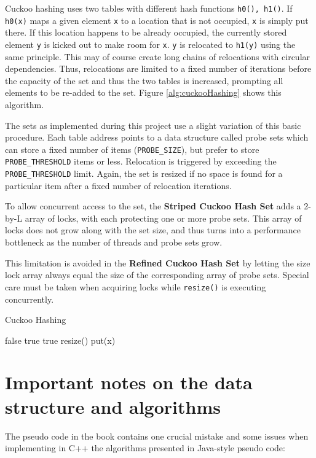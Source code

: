 \documentclass[a4paper,10pt]{article}
\begin{document}
Cuckoo hashing uses two tables with different hash functions
\lstinline|h0(), h1()|. If \lstinline|h0(x)| maps a given element \lstinline|x|
to a location that is not occupied, \lstinline|x| is simply put there. If this
location happens to be already occupied, the currently stored element
\lstinline|y| is kicked out to make room for \lstinline|x|. \lstinline|y| is
relocated to \lstinline|h1(y)| using the same principle. This may of course
create long chains of relocations with circular dependencies. Thus, relocations
are limited to a fixed number of iterations before the capacity of the set and
thus the two tables is increased, prompting all elements to be re-added to the
set.  Figure \ref{alg:cuckooHashing} shows this algorithm.

The sets as implemented during this project use a slight variation of this
basic procedure. Each table address points to a data structure called probe sets
which can store a fixed number of items (\lstinline|PROBE_SIZE|), but prefer
to store \lstinline|PROBE_THRESHOLD| items or less. Relocation is triggered
by exceeding the \lstinline|PROBE_THRESHOLD| limit. Again, the set is resized
if no space is found for a particular item after a fixed number of relocation
iterations.

To allow concurrent access to the set, the \textbf{Striped Cuckoo Hash Set}
adds a 2-by-L array of locks, with each protecting one or more probe sets.
This array of locks does not grow along with the set size, and thus turns into
a performance bottleneck as the number of threads and probe sets grow.

This limitation is avoided in the \textbf{Refined Cuckoo Hash Set} by letting
the size lock array always equal the size of the corresponding array of probe
sets. Special care must be taken when acquiring locks while
\lstinline|resize()| is executing concurrently.

\begin{algorithm}
\caption{Cuckoo Hashing}
\label{alg:cuckooHashing}
\begin{algorithmic}[5]
		\State \Return false
	\EndIf
			\State \Return true
			\State \Return true
		\EndIf
	\EndFor
	\State resize()
	\State put(x)
\EndFunction
\end{algorithmic}
\end{algorithm}

\section{Important notes on the data structure and algorithms}
\label{sec:implDetails}
The pseudo code in the book contains one crucial mistake and some issues when
implementing in C++ the algorithms presented in Java-style pseudo code:
\end{document}
